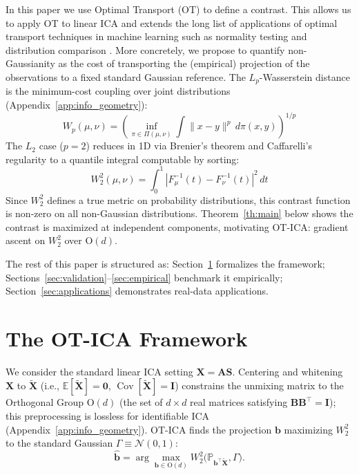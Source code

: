 \documentclass{tpm2026} %
\newcommand{\Xb}{\mathbf{X}}
\newcommand{\Ab}{\mathbf{A}}
\newcommand{\Sb}{\mathbf{S}}
\begin{document}
In this paper we use Optimal Transport (OT) \citep{monge1781, kantorovich1942}
to define a contrast.
This allows us to apply OT to linear ICA and extends the long list of applications of optimal transport techniques in machine learning such as normality testing \citep{delbarrio1999} and
distribution comparison \citep{peyre2019computational}.
More concretely, we propose to quantify non-Gaussianity as the cost of transporting the (empirical) projection of the observations to a fixed standard Gaussian reference.
The $L_p$-Wasserstein distance \citep{villani2003} is the minimum-cost coupling over joint distributions (Appendix~\ref{app:info_geometry}):
\begin{equation}
    W_p(\mu, \nu) = \left( \inf_{\pi \in \Pi(\mu, \nu)} \int \|x - y\|^p \, d\pi(x, y) \right)^{1/p}
\end{equation}
The $L_2$ case ($p=2$) reduces in 1D via Brenier's theorem \citep{brenier1991} and Caffarelli's regularity \citep{caffarelli1992} to a quantile integral computable by sorting:
\begin{equation}
    W_2^2(\mu, \nu) = \int_0^1 |F_\mu^{-1}(t) - F_\nu^{-1}(t)|^2 \, dt
\end{equation}
Since $W_2^2$ defines a true metric on probability distributions, this contrast function is non-zero on all non-Gaussian distributions.
Theorem~\ref{th:main} below shows the contrast is maximized at independent components, motivating OT-ICA: gradient ascent on $W_2^2$ over $\mathrm{O}(d)$.

The rest of this paper is structured as: Section~\ref{sec:OT-framework} formalizes the framework; Sections~\ref{sec:validation}--\ref{sec:empirical} benchmark it empirically; Section~\ref{sec:applications} demonstrates real-data applications.

\section{The OT-ICA Framework}\label{sec:OT-framework}

We consider the standard linear ICA setting $\Xb = \Ab\Sb$. Centering and whitening $\mathbf{X}$ to $\widetilde{\mathbf{X}}$ (i.e., $\mathbb{E}[\widetilde{\mathbf{X}}] = \mathbf{0}$, $\operatorname{Cov}[\widetilde{\mathbf{X}}] = \mathbf{I}$) constrains the unmixing matrix to the Orthogonal Group $\mathrm{O}(d)$ (the set of $d\times d$ real matrices satisfying $\mathbf{B}\mathbf{B}^\top = \mathbf{I}$); this preprocessing is lossless for identifiable ICA \citep{hyvarinen2001, cardoso2022} (Appendix~\ref{app:info_geometry}).
OT-ICA finds the projection $\mathbf{b}$ maximizing $W_2^2$ to the standard Gaussian $\Gamma \equiv \mathcal{N}(0,1)$:
\begin{equation}
    \hat{\mathbf{b}} = \arg\max_{\mathbf{b} \in \mathrm{O}(d)} W_2^2\big(\mathbb{P}_{\mathbf{b}^\top \widetilde{\mathbf{X}}}, \Gamma\big). \label{eq:otica_obj}
\end{equation}
\end{document}

